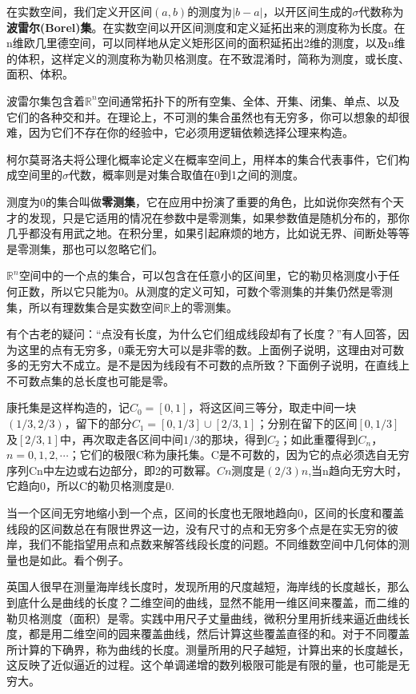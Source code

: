 在实数空间，我们定义开区间$ (a, b) $的测度为$ |b-a| $，以开区间生成的$ \sigma $代数称为\textbf{波雷尔(Borel)集}。在实数空间以开区间测度和定义延拓出来的测度称为长度。在n维欧几里德空间，可以同样地从定义矩形区间的面积延拓出2维的测度，以及n维的体积，这样定义的测度称为勒贝格测度。在不致混淆时，简称为测度，或长度、面积、体积。

波雷尔集包含着$ \mathbb{R}^n $空间通常拓扑下的所有空集、全体、开集、闭集、单点、以及它们的各种交和并。在理论上，不可测的集合虽然也有无穷多，你可以想象的却很难，因为它们不存在你的经验中，它必须用逻辑依赖选择公理来构造。

柯尔莫哥洛夫将公理化概率论定义在概率空间上，用样本的集合代表事件，它们构成空间里的$ \sigma $代数，概率则是对集合取值在0到1之间的测度。

测度为0的集合叫做\textbf{零测集}，它在应用中扮演了重要的角色，比如说你突然有个天才的发现，只是它适用的情况在参数中是零测集，如果参数值是随机分布的，那你几乎都没有用武之地。在积分里，如果引起麻烦的地方，比如说无界、间断处等等是零测集，那也可以忽略它们。

$ \mathbb{R}^n $空间中的一个点的集合，可以包含在任意小的区间里，它的勒贝格测度小于任何正数，所以它只能为0。从测度的定义可知，可数个零测集的并集仍然是零测集，所以有理数集合是实数空间$ \mathbb{R} $上的零测集。

有个古老的疑问：``点没有长度，为什么它们组成线段却有了长度？''有人回答，因为这里的点有无穷多，0乘无穷大可以是非零的数。上面例子说明，这理由对可数多的无穷大不成立。是不是因为线段有不可数的点所致？下面例子说明，在直线上不可数点集的总长度也可能是零。

\kaishu\setlength{\leftskip}{1em}

康托集是这样构造的，记$ C_0=[0,1] $，将这区间三等分，取走中间一块$ (1/3, 2/3) $，留下的部分$ C_1=[0,1/3]\cup[2/3,1] $；分别在留下的区间$ [0,1/3] $及$ [2/3,1] $中，再次取走各区间中间$ 1/3 $的那块，得到$ C_2 $；如此重覆得到$ C_n $，$ n=0,1,2,\cdots $；它们的极限C称为康托集。C是不可数的，因为它的点必须选自无穷序列Cn中左边或右边部分，即2的可数幂。$ Cn $测度是$ (2/3)n $,当n趋向无穷大时，它趋向0，所以C的勒贝格测度是0.

\songti\setlength{\leftskip}{0em}

当一个区间无穷地缩小到一个点，区间的长度也无限地趋向0，区间的长度和覆盖线段的区间数总在有限世界这一边，没有尺寸的点和无穷多个点是在实无穷的彼岸，我们不能指望用点和点数来解答线段长度的问题。不同维数空间中几何体的测量也是如此。看个例子。

\kaishu\setlength{\leftskip}{1em}

英国人很早在测量海岸线长度时，发现所用的尺度越短，海岸线的长度越长，那么到底什么是曲线的长度？二维空间的曲线，显然不能用一维区间来覆盖，而二维的勒贝格测度（面积）是零。实践中用尺子丈量曲线，微积分里用折线来逼近曲线长度，都是用二维空间的园来覆盖曲线，然后计算这些覆盖直径的和。对于不同覆盖所计算的下确界，称为曲线的长度。测量所用的尺子越短，计算出来的长度越长，这反映了近似逼近的过程。这个单调递增的数列极限可能是有限的量，也可能是无穷大。

